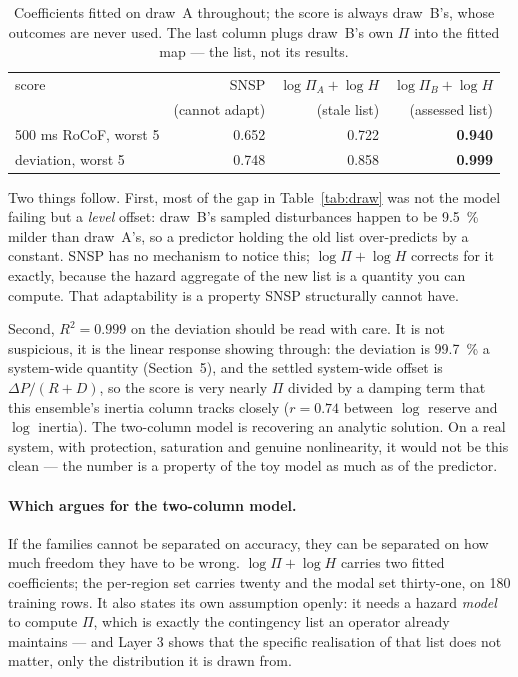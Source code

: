 \documentclass[11pt,a4paper]{article}
\newcommand{\Rtwo}{\ensuremath{R^{2}}}
\begin{document}
\begin{table}[h]
\centering
\small
\caption{Coefficients fitted on draw~A throughout; the score is always
draw~B's, whose outcomes are never used. The last column plugs draw~B's own
$\Pi$ into the fitted map --- the list, not its results.}
\begin{tabular}{lrrr}
\toprule
score & SNSP & $\log\Pi_A + \log H$ & $\log\Pi_B + \log H$ \\
      & (cannot adapt) & (stale list) & (assessed list) \\
\midrule
500 ms RoCoF, worst 5 & 0.652 & 0.722 & \textbf{0.940} \\
deviation, worst 5    & 0.748 & 0.858 & \textbf{0.999} \\
\bottomrule
\end{tabular}
\label{tab:applied}
\end{table}

Two things follow. First, most of the gap in Table~\ref{tab:draw} was not the
model failing but a \emph{level} offset: draw~B's sampled disturbances happen
to be \SI{9.5}{\percent} milder than draw~A's, so a predictor holding the old
list over-predicts by a constant. SNSP has no mechanism to notice this;
$\log\Pi + \log H$ corrects for it exactly, because the hazard aggregate of
the new list is a quantity you can compute. That adaptability is a property
SNSP structurally cannot have.

Second, $\Rtwo = 0.999$ on the deviation should be read with care. It is not
suspicious, it is the linear response showing through: the deviation is
\SI{99.7}{\percent} a system-wide quantity (Section~5), and the settled
system-wide offset is $\Delta P/(R+D)$, so the score is very nearly
$\Pi$ divided by a damping term that this ensemble's inertia column tracks
closely ($r = 0.74$ between $\log$ reserve and $\log$ inertia). The two-column
model is recovering an analytic solution. On a real system, with protection,
saturation and genuine nonlinearity, it would not be this clean --- the number
is a property of the toy model as much as of the predictor.

\paragraph{Which argues for the two-column model.} If the families cannot be
separated on accuracy, they can be separated on how much freedom they have to
be wrong. $\log\Pi + \log H$ carries two fitted coefficients; the per-region
set carries twenty and the modal set thirty-one, on 180 training rows. It
also states its own assumption openly: it needs a hazard \emph{model} to
compute $\Pi$, which is exactly the contingency list an operator already
maintains --- and Layer 3 shows that the specific realisation of that list does
not matter, only the distribution it is drawn from.
\end{document}
